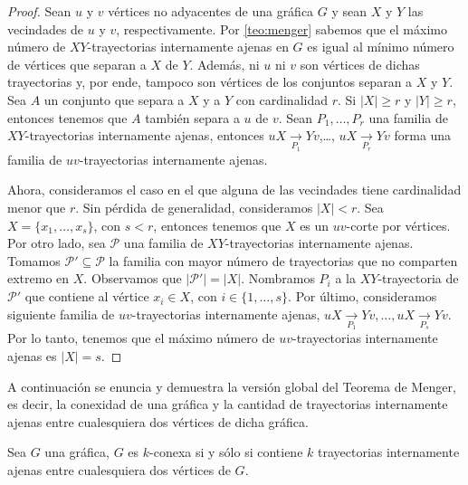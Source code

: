 \begin{proof}
    Sean $u$ y $v$ v\'ertices no adyacentes de una gr\'afica $G$ y sean $X$ y
    $Y$ las vecindades de $u$ y $v$, respectivamente. Por \cref{teo:menger}
    sabemos que el m\'aximo n\'umero de $XY$-trayectorias internamente ajenas en
    $G$ es igual al m\'inimo n\'umero de v\'ertices que separan a $X$ de $Y$.
    Adem\'as, ni $u$ ni $v$ son v\'ertices de dichas trayectorias y, por ende,
    tampoco son v\'ertices de los conjuntos separan a $X$ y $Y$. Sea  $A$ un
    conjunto que separa a $X$ y a $Y$ con cardinalidad $r$. Si $|X| \geq r$ y
    $|Y| \geq r$, entonces tenemos que $A$ tambi\'en separa a $u$ de $v$. Sean
    $P_1, \dots, P_r$ una familia de $XY$-trayectorias internamente ajenas,
    entonces $uX\xrightarrow[P_1]{}Yv$,\dots, $uX\xrightarrow[P_r]{}Yv$ forma
    una familia de $uv$-trayectorias internamente ajenas. 

    Ahora, consideramos el caso en el que alguna de las vecindades tiene
    cardinalidad menor que $r$.  Sin p\'erdida de generalidad, consideramos
    $|X|<r$. Sea $X = \{x_1, \dots, x_s\}$, con $s<r$, entonces tenemos que $X$
    es un $uv$-corte por v\'ertices. Por otro lado, sea $\mathcal{P}$ una
    familia de $XY$-trayectorias internamente ajenas. Tomamos $\mathcal{P'}
    \subseteq \mathcal{P}$ la familia con mayor n\'umero de trayectorias que no
    comparten extremo en $X$. Observamos que $|\mathcal{P'}| = |X|$. Nombramos
    $P_i$ a la $XY$-trayectoria de $\mathcal{P'}$ que contiene al v\'ertice $x_i
    \in X$, con $i \in \{1, \dots, s\}$. Por \'ultimo, consideramos siguiente
    familia de $uv$-trayectorias internamente ajenas, $uX\xrightarrow[P_1]{}Yv,
    \dots, uX\xrightarrow[P_s]{}Yv$. Por lo tanto, tenemos que el m\'aximo
    n\'umero de $uv$-trayectorias internamente ajenas es $|X|=s$.
\end{proof}


A continuaci\'on  se enuncia y demuestra la versi\'on global del Teorema de
Menger, es decir, la conexidad de una gr\'afica y la cantidad de trayectorias
internamente ajenas entre cualesquiera dos v\'ertices de dicha gr\'afica.

\begin{teorema}
    \label{teo:mengerGen}
     Sea $G$ una gr\'afica, $G$ es $k$-conexa si y s\'olo si contiene
     $k$ trayectorias internamente ajenas entre cualesquiera dos v\'ertices de
     $G$.
 \end{teorema}

